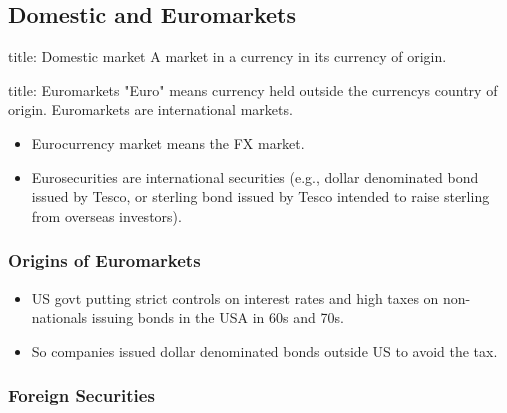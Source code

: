 \documentclass[
]{article}
\newenvironment{Shaded}{}{}
\newcommand{\NormalTok}[1]{#1}
\providecommand{\tightlist}{%
  \setlength{\itemsep}{0pt}\setlength{\parskip}{0pt}}
\begin{document}
\hypertarget{domestic-and-euromarkets}{%
\subsection{Domestic and Euromarkets}\label{domestic-and-euromarkets}}

\begin{Shaded}
\begin{Highlighting}[]
\NormalTok{title: Domestic market}
\NormalTok{A market in a currency in its currency of origin. }
\end{Highlighting}
\end{Shaded}

\begin{Shaded}
\begin{Highlighting}[]
\NormalTok{title: Euromarkets}
\NormalTok{"Euro" means currency held outside the currency\textquotesingle{}s country of origin. Euromarkets are international markets. }
\end{Highlighting}
\end{Shaded}

\begin{itemize}
\tightlist
\item
  Eurocurrency market means the FX market.
\item
  Eurosecurities are international securities (e.g., dollar denominated
  bond issued by Tesco, or sterling bond issued by Tesco intended to
  raise sterling from overseas investors).
\end{itemize}

\hypertarget{origins-of-euromarkets}{%
\subsubsection{Origins of Euromarkets}\label{origins-of-euromarkets}}

\begin{itemize}
\tightlist
\item
  US govt putting strict controls on interest rates and high taxes on
  non-nationals issuing bonds in the USA in 60s and 70s.
\item
  So companies issued dollar denominated bonds outside US to avoid the
  tax.
\end{itemize}

\hypertarget{foreign-securities}{%
\subsubsection{Foreign Securities}\label{foreign-securities}}
\end{document}
